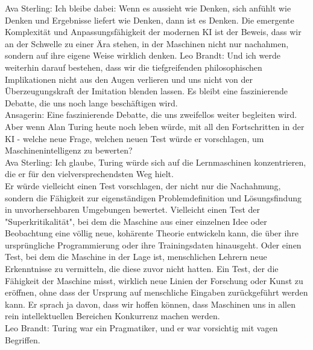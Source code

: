\documentclass[a4paper,12pt]{scrartcl}
\begin{document}
Ava Sterling: Ich bleibe dabei: Wenn es aussieht wie Denken, sich anfühlt wie Denken und Ergebnisse liefert wie Denken, dann ist es Denken. Die emergente Komplexität und Anpassungsfähigkeit der modernen KI ist der Beweis, dass wir an der Schwelle zu einer Ära stehen, in der Maschinen nicht nur nachahmen, sondern auf ihre eigene Weise wirklich denken.
Leo Brandt: Und ich werde weiterhin darauf bestehen, dass wir die tiefgreifenden philosophischen Implikationen nicht aus den Augen verlieren und uns nicht von der Überzeugungskraft der Imitation blenden lassen. Es bleibt eine faszinierende Debatte, die uns noch lange beschäftigen wird.\\
Ansagerin: Eine faszinierende Debatte, die uns zweifellos weiter begleiten wird. Aber wenn Alan Turing heute noch leben würde, mit all den Fortschritten in der KI - welche neue Frage, welchen neuen Test würde er vorschlagen, um Maschinenintelligenz zu bewerten?\\
Ava Sterling: Ich glaube, Turing würde sich auf die Lernmaschinen konzentrieren, die er für den vielversprechendsten Weg hielt.\\ 
Er würde vielleicht einen Test vorschlagen, der nicht nur die Nachahmung, sondern die Fähigkeit zur eigenständigen Problemdefinition und Lösungsfindung in unvorhersehbaren Umgebungen bewertet. Vielleicht einen Test der "Superkritikalität", bei dem die Maschine aus einer einzelnen Idee oder Beobachtung eine völlig neue, kohärente Theorie entwickeln kann, die über ihre ursprüngliche Programmierung oder ihre Trainingsdaten hinausgeht. Oder einen Test, bei dem die Maschine in der Lage ist, menschlichen Lehrern neue Erkenntnisse zu vermitteln, die diese zuvor nicht hatten. Ein Test, der die Fähigkeit der Maschine misst, wirklich neue Linien der Forschung oder Kunst zu eröffnen, ohne dass der Ursprung auf menschliche Eingaben zurückgeführt werden kann. Er sprach ja davon, dass wir hoffen können, dass Maschinen uns in allen rein intellektuellen Bereichen Konkurrenz machen werden.\\
Leo Brandt: Turing war ein Pragmatiker, und er war vorsichtig mit vagen Begriffen.\\ 
\end{document}
